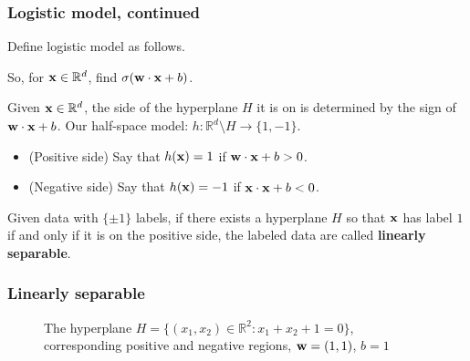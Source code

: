 \documentclass{beamer}
\theoremstyle{example}
\begin{document}
\begin{frame}
\frametitle{Logistic model, continued}
    Define logistic model as follows.
    
    So, for ${\bf x}\in\mathbb R^d$, find $\sigma({\bf w}\cdot{\bf x}+b)$. 
    
    \pause
    Given ${\bf x}\in \mathbb R^d$, the side of the hyperplane $H$ it is on is determined by the sign of ${\bf w}\cdot{\bf x} + b$. Our half-space model: $h:\mathbb R^d\setminus H \to \{1,-1\}$.
    \pause
    \begin{itemize}
        \item (Positive side) Say that $h({\bf x}) = 1$ if ${\bf w}\cdot{\bf x}+b > 0$.
        \item (Negative side) Say that $h({\bf x}) = -1$ if ${\bf x}\cdot{\bf x}+b < 0$. 
    \end{itemize}

    \pause
    Given data with $\{\pm1\}$ labels, if there exists a hyperplane $H$ so that ${\bf x}$ has label $1$ if and only if it is on the positive side, the labeled data are called \textbf{linearly separable}. 

\end{frame}

\begin{frame}
    \frametitle{Linearly separable}
    \begin{figure}[h!]
        \centering
        \caption{The hyperplane $H = \{(x_1,x_2)\in \mathbb R^2: x_1+ x_2+ 1 = 0\}$, corresponding positive and negative regions, ${\bf w} = (1, 1)$, $b = 1$}
        \label{figure:R2HyperplaneLabeled}
    \end{figure}
\end{frame}
\end{document}
